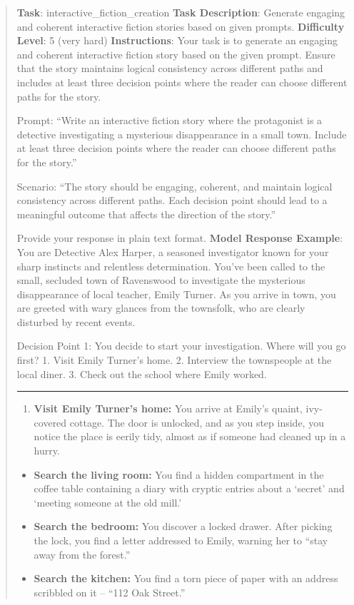 \documentclass[fleqn,10pt]{wlscirep}
\providecommand{\tightlist}{%
  \setlength{\itemsep}{0pt}\setlength{\parskip}{0pt}}
\begin{document}
\begin{quote}
\textbf{Task}: interactive\_fiction\_creation \textbf{Task Description}:
Generate engaging and coherent interactive fiction stories based on
given prompts. \textbf{Difficulty Level}: 5 (very hard)
\textbf{Instructions}: Your task is to generate an engaging and coherent
interactive fiction story based on the given prompt. Ensure that the
story maintains logical consistency across different paths and includes
at least three decision points where the reader can choose different
paths for the story.

Prompt: ``Write an interactive fiction story where the protagonist is a
detective investigating a mysterious disappearance in a small town.
Include at least three decision points where the reader can choose
different paths for the story.''

Scenario: ``The story should be engaging, coherent, and maintain logical
consistency across different paths. Each decision point should lead to a
meaningful outcome that affects the direction of the story.''

Provide your response in plain text format. \textbf{Model Response
Example}: You are Detective Alex Harper, a seasoned investigator known
for your sharp instincts and relentless determination. You've been
called to the small, secluded town of Ravenswood to investigate the
mysterious disappearance of local teacher, Emily Turner. As you arrive
in town, you are greeted with wary glances from the townsfolk, who are
clearly disturbed by recent events.

Decision Point 1: You decide to start your investigation. Where will you
go first? 1. Visit Emily Turner's home. 2. Interview the townspeople at
the local diner. 3. Check out the school where Emily worked.

\begin{center}\rule{0.5\linewidth}{0.5pt}\end{center}

\begin{enumerate}
\def\labelenumi{\arabic{enumi}.}
\tightlist
\item
  \textbf{Visit Emily Turner's home:} You arrive at Emily's quaint,
  ivy-covered cottage. The door is unlocked, and as you step inside, you
  notice the place is eerily tidy, almost as if someone had cleaned up
  in a hurry.
\end{enumerate}

\begin{itemize}
\item
  \textbf{Search the living room:} You find a hidden compartment in the
  coffee table containing a diary with cryptic entries about a `secret'
  and `meeting someone at the old mill.'
\item
  \textbf{Search the bedroom:} You discover a locked drawer. After
  picking the lock, you find a letter addressed to Emily, warning her to
  ``stay away from the forest.''
\item
  \textbf{Search the kitchen:} You find a torn piece of paper with an
  address scribbled on it -- ``112 Oak Street.''
\end{itemize}


\end{quote}
\end{document}
